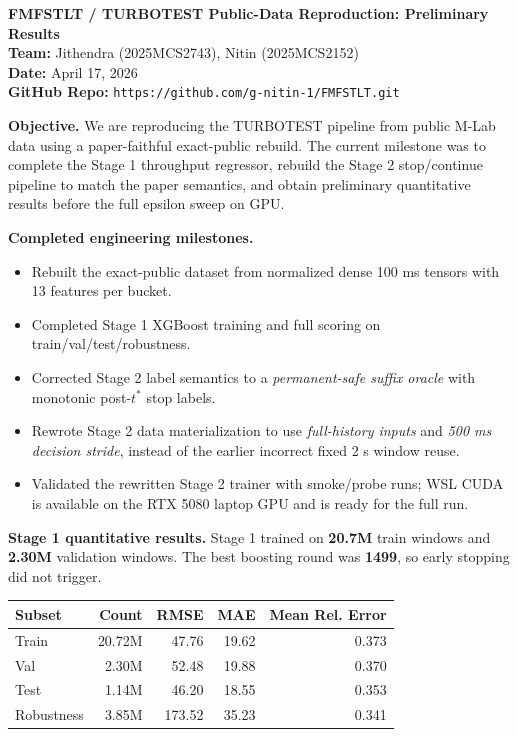 \documentclass[10pt]{article}
\begin{document}
\small

{\Large \textbf{FMFSTLT / TURBOTEST Public-Data Reproduction: Preliminary Results}}\\
\textbf{Team:} Jithendra (2025MCS2743), Nitin (2025MCS2152)\\
\textbf{Date:} April 17, 2026\\
\textbf{GitHub Repo:} \texttt{https://github.com/g-nitin-1/FMFSTLT.git}

\textbf{Objective.} We are reproducing the TURBOTEST pipeline from public M-Lab data using a paper-faithful exact-public rebuild. The current milestone was to complete the Stage 1 throughput regressor, rebuild the Stage 2 stop/continue pipeline to match the paper semantics, and obtain preliminary quantitative results before the full epsilon sweep on GPU.

\textbf{Completed engineering milestones.}
\begin{itemize}
\item Rebuilt the exact-public dataset from normalized dense 100 ms tensors with 13 features per bucket.
\item Completed Stage 1 XGBoost training and full scoring on train/val/test/robustness.
\item Corrected Stage 2 label semantics to a \emph{permanent-safe suffix oracle} with monotonic post-$t^*$ stop labels.
\item Rewrote Stage 2 data materialization to use \emph{full-history inputs} and \emph{500 ms decision stride}, instead of the earlier incorrect fixed 2 s window reuse.
\item Validated the rewritten Stage 2 trainer with smoke/probe runs; WSL CUDA is available on the RTX 5080 laptop GPU and is ready for the full run.
\end{itemize}

\textbf{Stage 1 quantitative results.} Stage 1 trained on \textbf{20.7M} train windows and \textbf{2.30M} validation windows. The best boosting round was \textbf{1499}, so early stopping did not trigger.

\begin{center}
\begin{tabular}{|l|r|r|r|r|}
\hline
Subset & Count & RMSE & MAE & Mean Rel. Error \\
\hline
Train & 20.72M & 47.76 & 19.62 & 0.373 \\
Val & 2.30M & 52.48 & 19.88 & 0.370 \\
Test & 1.14M & 46.20 & 18.55 & 0.353 \\
Robustness & 3.85M & 173.52 & 35.23 & 0.341 \\
\hline
\end{tabular}
\end{center}
\end{document}
